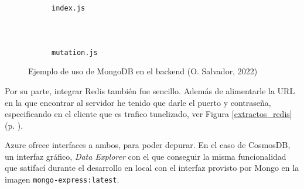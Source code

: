 \documentclass[11pt]{article}
\begin{document}
\begin{flushleft}
		\begin{figure}[htb]
			\centering
			\hspace{.5cm}
			\begin{subfigure}{0.4\textwidth}
				\inputminted[fontsize=\scriptsize, firstline=47, lastline=47, linenos, frame=single, breaklines]{javascript}{../../backend/src/index.js}
				\vspace{-.6cm}
				\inputminted[fontsize=\scriptsize, firstline=54, lastline=54, linenos, frame=single, breaklines]{javascript}{../../backend/src/index.js}
				\vspace{-.6cm}
				\inputminted[fontsize=\scriptsize, firstline=67, lastline=67, linenos, frame=single, breaklines, gobble=6]{javascript}{../../backend/src/index.js}
				\vspace{-.6cm}
				\inputminted[fontsize=\scriptsize, firstline=84, lastline=84, linenos, frame=single, breaklines, gobble=6]{javascript}{../../backend/src/index.js}
				\caption{\texttt{index.js}}	
			\end{subfigure}
			\hspace{1.3cm}
			\begin{subfigure}{0.45\textwidth}
				\inputminted[fontsize=\scriptsize, firstline=57, lastline=57, linenos, frame=single, breaklines, gobble=3]{javascript}{../../backend/src/resolvers/mutation.js}
				\vspace{-.6cm}
				\inputminted[fontsize=\scriptsize, firstline=59, lastline=59, linenos, frame=single, breaklines, gobble=5]{javascript}{../../backend/src/resolvers/mutation.js}
				\vspace{-.6cm}
				\inputminted[fontsize=\scriptsize, firstline=68, lastline=68, linenos, frame=single, breaklines, gobble=7]{javascript}{../../backend/src/resolvers/mutation.js}
				\caption{\texttt{mutation.js}}	
			\end{subfigure}
			\caption{Ejemplo de uso de MongoDB en el backend (O. Salvador, 2022)}
		\end{figure}
		
	Por su parte, integrar Redis también fue sencillo. Además de alimentarle la URL en la que encontrar al servidor he tenido que darle el puerto y contraseña, especificando en el cliente que es trafico tunelizado, ver Figura \ref{extractos_redis} (p. \pageref{extractos_redis}).
	\linebreak
	
	Azure ofrece interfaces a ambos, para poder depurar. En el caso de CosmosDB, un interfaz gráfico, \textit{Data Explorer} con el que conseguir la misma funcionalidad que satifací durante el desarrollo en local con el interfaz provisto por Mongo en la imagen \texttt{mongo-express:latest}.
	\linebreak
			

\end{flushleft}
\end{document}
